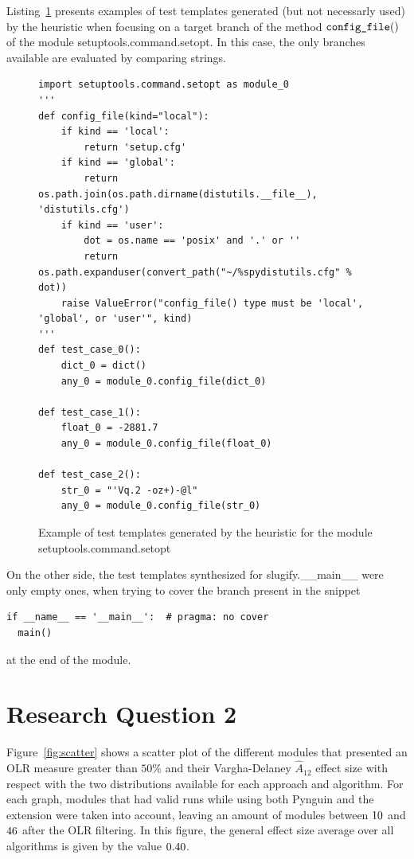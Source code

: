 \documentclass[%
  chapterprefix=false,%
  open=right,%
  twoside=true,%
  paper=a4,%
  logofile={Figures/logo.png},%
  thesistype=master,%
  UKenglish,%
]{se2thesis}
\newcommand{\callable}[2][]{\(\text{\texttt{#2}}(#1)\)}
\begin{document}
Listing~\ref{lst:9} presents examples of test templates generated (but not necessarly used) by the heuristic when focusing on a target branch of the method \callable[]{config\_file} of the module setuptools.command.setopt.
In this case, the only branches available are evaluated by comparing strings.

\begin{figure}
\begin{verbatim}
import setuptools.command.setopt as module_0
'''
def config_file(kind="local"):
    if kind == 'local':
        return 'setup.cfg'
    if kind == 'global':
        return os.path.join(os.path.dirname(distutils.__file__), 'distutils.cfg')
    if kind == 'user':
        dot = os.name == 'posix' and '.' or ''
        return os.path.expanduser(convert_path("~/%spydistutils.cfg" % dot))
    raise ValueError("config_file() type must be 'local', 'global', or 'user'", kind)
'''
def test_case_0():
    dict_0 = dict()
    any_0 = module_0.config_file(dict_0)

def test_case_1():
    float_0 = -2881.7
    any_0 = module_0.config_file(float_0)

def test_case_2():
    str_0 = "'Vq.2 -oz+)-@l"
    any_0 = module_0.config_file(str_0)
\end{verbatim}
\caption{Example of test templates generated by the heuristic for the module setuptools.command.setopt}\label{lst:9}
\end{figure}

On the other side, the test templates synthesized for slugify.\_\_main\_\_ were only empty ones, when trying to cover the branch present in the snippet

\begin{verbatim}
if __name__ == '__main__':  # pragma: no cover
  main()
\end{verbatim}

at the end of the module.

\newpage

\section{Research Question 2}

Figure~\ref{fig:scatter} shows a scatter plot of the different modules that presented an OLR measure greater than \(50\%\) and their Vargha-Delaney \(\hat{A}_{12}\) effect size with respect with the two distributions available for each approach and algorithm.
For each graph, modules that had valid runs while using both Pynguin and the extension were taken into account, leaving an amount of modules between \(10\) and \(46\) after the OLR filtering.
In this figure, the general effect size average over all algorithms is given by the value \(0.40\). 
\end{document}
